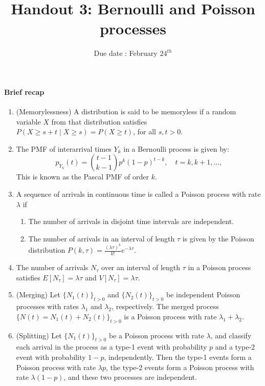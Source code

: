 \documentclass[twocolumn,12pt,a4paper]{article}
\title{ \bfseries \Huge {Handout 3: Bernoulli and Poisson processes }}
\date{Due date : February $24^{th}$}
\newcounter{num}  %
\begin{document}
	\maketitle
	\setcounter{num}{1}  %
	
	\thispagestyle{empty} 
	\paragraph{Brief recap}
	\begin{enumerate}
			\item (Memorylessness) A distribution is said to be memoryless if a random variable $X$ from that distribution satisfies
		$P(X \geq s + t \mid X \geq s) = P(X \geq t)$, for all $s, t > 0$.
		\item  The PMF of interarrival times $Y_k$ in a Bernoulli process is given by:
		\[
		p_{Y_k}(t) = \binom{t-1}{k-1} p^k (1 - p)^{t-k}, \quad t = k, k+1, \dots,
		\]
		This is known as the Pascal PMF of order $k$.
		\item A sequence of arrivals in continuous time is called a Poisson process with rate $\lambda$ if
	\begin{enumerate}
		\item The number of arrivals in disjoint time intervals are independent.
		\item The number of arrivals in an interval of length $\tau$ is given by the Poisson distribution 
		$
		P(k,\tau) = \frac{(\lambda\tau)^k}{k!}e^{-\lambda\tau}.
		$
	\end{enumerate}	
	\item The number of arrivals $N_\tau$ over an interval of length $\tau$ in a Poisson process satisfies $E[N_\tau] = \lambda\tau$ and $ V[N_\tau] = \lambda\tau$.
	\item (Merging) Let $\{N_1(t)\}_{t > 0}$ and $\{N_2(t)\}_{t > 0}$ be independent Poisson processes with rates $\lambda_1$ and $\lambda_2$, respectively. 
	The merged process $\{N (t) = N_1(t) + N_2(t)\}_{t > 0}$ is a Poisson process with rate $\lambda_1+\lambda_2$.
	\item (Splitting) Let $\{N_1(t)\}_{t > 0}$ be a Poisson process with rate
	$\lambda$, and classify each arrival in the process as a type-1 event with probability $p$ and a type-2 event with probability $1 - p$, independently. 
	Then the type-1 events form a Poisson process with rate $\lambda p$, the type-2 events form a Poisson process with rate
	$\lambda (1-p)$, and these two processes are independent.
	\end{enumerate}
\end{document}
